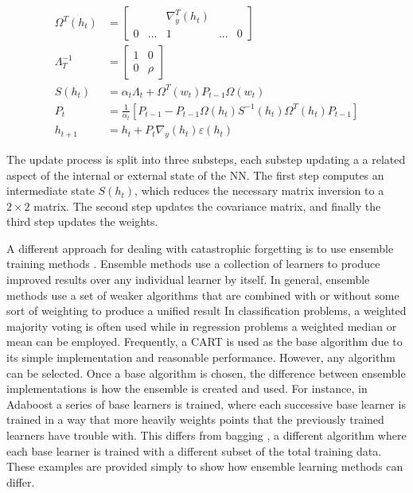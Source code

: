 	\begin{align}\label{bg:RLM_ref}
		\Omega^T(h_t) &= \begin{bmatrix}
			&& \nabla_y^T(h_t) && \\ 0 & ... & 1 & ... & 0
		\end{bmatrix} \\
		\Lambda_{T}^{-1} &= \begin{bmatrix}
			1&0\\0&\rho
		\end{bmatrix} \\
		S(h_t) &= \alpha_t\Lambda_t + \Omega^T(w_t)P_{t-1}\Omega(w_t) \\
		P_t &= \frac{1}{\alpha_t}[P_{t-1}-P_{t-1}\Omega(h_t)S^{-1}(h_t)\Omega^T(h_t)P_{t-1}]\\
		h_{t+1} &= h_t + P_t \nabla_y(h_t)\varepsilon(h_t) 
	\end{align}
	\par The update process is split into three substeps, each substep updating a a related aspect of the internal or external state of the NN. The first step computes an intermediate state $S(h_t)$, which reduces the necessary matrix inversion to a $2\times2$ matrix. The second step updates the covariance matrix, and finally the third step updates the weights. 
	\par A different approach for dealing with catastrophic forgetting is to use ensemble training methods \cite{NSE_learning_review}. Ensemble methods use a collection of learners to produce improved results over any individual learner by itself. In general, ensemble methods use a set of weaker algorithms that are combined with or without some sort of weighting to produce a unified result %
	In classification problems, a weighted majority voting is often used while in regression problems a weighted median or mean can be employed. Frequently, a CART is used as the base algorithm due to its simple implementation and reasonable performance. However, any algorithm can be selected. Once a base algorithm is chosen, the difference between ensemble implementations is how the ensemble is created and used. For instance, in Adaboost \cite{solomatine2004adaboost} a series of base learners is trained, where each successive base learner is trained in a way that more heavily weights points that the previously trained learners have trouble with. This differs from bagging \cite{breiman1996bagging}, a different algorithm where each base learner is trained with a different subset of the total training data. These examples are provided simply to show how ensemble learning methods can differ.
